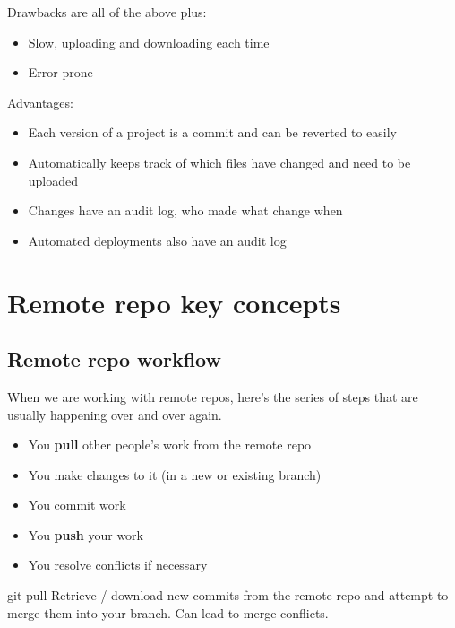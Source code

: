 
Drawbacks are all of the above plus:
\begin{itemize}
    \item Slow, uploading and downloading each time
	\item Error prone
\end{itemize}


Advantages:
\begin{itemize}
    \item Each version of a project is a commit and can be reverted to easily
    \item Automatically keeps track of which files have changed and need to be uploaded
    \item Changes have an audit log, who made what change when
	\item Automated deployments also have an audit log
\end{itemize}


\section{Remote repo key concepts}

\subsection{Remote repo workflow}

When we are working with remote repos, here's the series of steps that are usually happening over and over again.
\\

\begin{itemize}
    \item You \textbf{pull} other people's work from the remote repo
    \item You make changes to it (in a new or existing branch)
    \item You commit work
    \item You \textbf{push} your work
	\item You resolve conflicts if necessary
\end{itemize}

\begin{infobox}{git pull}
	Retrieve / download new commits from the remote repo and attempt to merge them into your branch. Can lead to merge conflicts.
\end{infobox}

